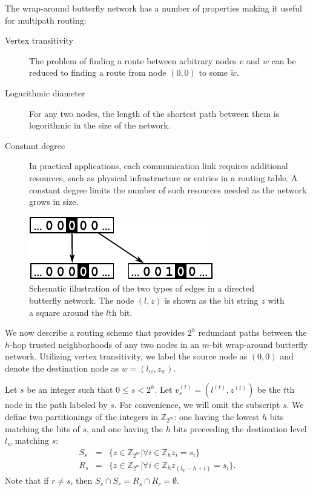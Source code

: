 \documentclass[prodmode,permissions]{acmsmall-ec16}
\newcommand{\beq}{\begin{eqnarray}}
\newcommand{\eeq}{\end{eqnarray}}
\begin{document}
The wrap-around butterfly network has a number of properties making it useful for multipath routing:
\begin{description}
\item[Vertex transitivity]
The problem
of finding a route between arbitrary nodes $v$ and $w$
can be reduced to finding a route from node $(0,0)$ to some $\tilde{w}$.
\item[Logarithmic diameter]
For any two nodes, the length of the shortest path between them is logorithmic
in the size of the network.
\item[Constant degree]
In practical applications, each communication link requires additional resources,
such as physical infrastructure or entries in a routing table.
A constant degree limits the number of such resources needed as the network
grows in size.
\end{description}

\begin{figure}
\begin{center}
\includegraphics{fig-butterfly.pdf}
\end{center}
\caption{
Schematic illustration of the two types of edges in a directed butterfly network.
The node $(l,z)$ is shown as the bit string $z$ with a square around the $l$th bit.
\label{fig:butterfly}
}
\end{figure}

We now describe a routing scheme that provides $2^h$ redundant paths between
the $h$-hop trusted neighborhoods of any two nodes in an $m$-bit
wrap-around butterfly network.
Utilizing vertex transitivity, we label the source node as $(0, 0)$ and
denote the destination node as $w = (l_w, z_w)$.

Let $s$ be an integer such that $0 \leq s < 2^h$.
Let $v_s^{(t)} = (l^{(t)}, z^{(t)})$ be the $t$th node in the path labeled by $s$.
For convenience, we will omit the subscript $s$.
We define two partitionings of the integers in $\mathbb{Z}_{2^m}$:
one having the lowest $h$ bits matching the
bits of $s$, and one having the $h$ bits preceeding the destination level $l_w$
matching $s$:
\beq
S_s &=& \{z \in \mathbb{Z}_{2^m} | \forall i \in \mathbb{Z}_h z_i = s_i \} \\
R_s &=& \{z \in \mathbb{Z}_{2^m} | \forall i \in \mathbb{Z}_h z_{(l_w - h + i)} = s_i \}.
\eeq
Note that if $r \neq s$, then $S_s \cap S_r = R_s \cap R_r = \emptyset$.
\end{document}
